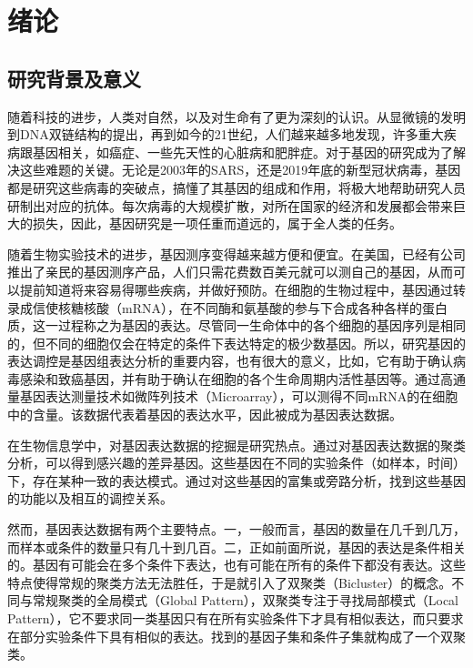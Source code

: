 \chapter{绪论}

\section{研究背景及意义}
    随着科技的进步，人类对自然，以及对生命有了更为深刻的认识。从显微镜的发明到DNA双链结构的提出，再到如今的21世纪，人们越来越多地发现，许多重大疾病跟基因相关，如癌症、一些先天性的心脏病和肥胖症。对于基因的研究成为了解决这些难题的关键。无论是2003年的SARS，还是2019年底的新型冠状病毒，基因都是研究这些病毒的突破点，搞懂了其基因的组成和作用，将极大地帮助研究人员研制出对应的抗体。每次病毒的大规模扩散，对所在国家的经济和发展都会带来巨大的损失，因此，基因研究是一项任重而道远的，属于全人类的任务。

    随着生物实验技术的进步，基因测序变得越来越方便和便宜。在美国，已经有公司推出了亲民的基因测序产品，人们只需花费数百美元就可以测自己的基因，从而可以提前知道将来容易得哪些疾病，并做好预防。在细胞的生物过程中，基因通过转录成信使核糖核酸（mRNA），在不同酶和氨基酸的参与下合成各种各样的蛋白质，这一过程称之为基因的表达。尽管同一生命体中的各个细胞的基因序列是相同的，但不同的细胞仅会在特定的条件下表达特定的极少数基因。所以，研究基因的表达调控是基因组表达分析的重要内容，也有很大的意义，比如，它有助于确认病毒感染和致癌基因，并有助于确认在细胞的各个生命周期内活性基因等。通过高通量基因表达测量技术如微阵列技术（Microarray），可以测得不同mRNA的在细胞中的含量。该数据代表着基因的表达水平，因此被成为基因表达数据。

    在生物信息学中，对基因表达数据的挖掘是研究热点。通过对基因表达数据的聚类分析，可以得到感兴趣的差异基因。这些基因在不同的实验条件（如样本，时间）下，存在某种一致的表达模式。通过对这些基因的富集或旁路分析，找到这些基因的功能以及相互的调控关系。

    然而，基因表达数据有两个主要特点。一，一般而言，基因的数量在几千到几万，而样本或条件的数量只有几十到几百。二，正如前面所说，基因的表达是条件相关的。基因有可能会在多个条件下表达，也有可能在所有的条件下都没有表达。这些特点使得常规的聚类方法无法胜任，于是就引入了双聚类（Bicluster）的概念。不同与常规聚类的全局模式（Global Pattern），双聚类专注于寻找局部模式（Local Pattern），它不要求同一类基因只有在所有实验条件下才具有相似表达，而只要求在部分实验条件下具有相似的表达。找到的基因子集和条件子集就构成了一个双聚类。

